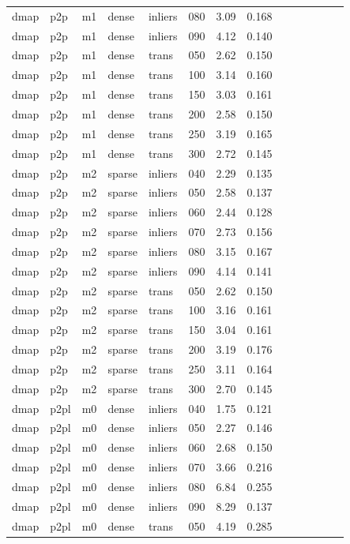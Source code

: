 \begin{table}[htbp]
\begin{tabular}{llllllrrrrrrrr}
  dmap & p2p & m1 & dense & inliers & 080 & 3.09 & 0.168 \\
  dmap & p2p & m1 & dense & inliers & 090 & 4.12 & 0.140 \\
  dmap & p2p & m1 & dense & trans & 050 & 2.62 & 0.150 \\
  dmap & p2p & m1 & dense & trans & 100 & 3.14 & 0.160 \\
  dmap & p2p & m1 & dense & trans & 150 & 3.03 & 0.161 \\
  dmap & p2p & m1 & dense & trans & 200 & 2.58 & 0.150 \\
  dmap & p2p & m1 & dense & trans & 250 & 3.19 & 0.165 \\
  dmap & p2p & m1 & dense & trans & 300 & 2.72 & 0.145 \\
  dmap & p2p & m2 & sparse & inliers & 040 & 2.29 & 0.135 \\
  dmap & p2p & m2 & sparse & inliers & 050 & 2.58 & 0.137 \\
  dmap & p2p & m2 & sparse & inliers & 060 & 2.44 & 0.128 \\
  dmap & p2p & m2 & sparse & inliers & 070 & 2.73 & 0.156 \\
  dmap & p2p & m2 & sparse & inliers & 080 & 3.15 & 0.167 \\
  dmap & p2p & m2 & sparse & inliers & 090 & 4.14 & 0.141 \\
  dmap & p2p & m2 & sparse & trans & 050 & 2.62 & 0.150 \\
  dmap & p2p & m2 & sparse & trans & 100 & 3.16 & 0.161 \\
  dmap & p2p & m2 & sparse & trans & 150 & 3.04 & 0.161 \\
  dmap & p2p & m2 & sparse & trans & 200 & 3.19 & 0.176 \\
  dmap & p2p & m2 & sparse & trans & 250 & 3.11 & 0.164 \\
  dmap & p2p & m2 & sparse & trans & 300 & 2.70 & 0.145 \\
  dmap & p2pl & m0 & dense & inliers & 040 & 1.75 & 0.121 \\
  dmap & p2pl & m0 & dense & inliers & 050 & 2.27 & 0.146 \\
  dmap & p2pl & m0 & dense & inliers & 060 & 2.68 & 0.150 \\
  dmap & p2pl & m0 & dense & inliers & 070 & 3.66 & 0.216 \\
  dmap & p2pl & m0 & dense & inliers & 080 & 6.84 & 0.255 \\
  dmap & p2pl & m0 & dense & inliers & 090 & 8.29 & 0.137 \\
  dmap & p2pl & m0 & dense & trans & 050 & 4.19 & 0.285 \\

\end{tabular}
\end{table}
